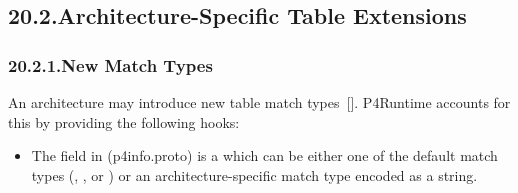\documentclass[11pt]{article}
\begin{document}
{%
\subsection{20.2.\hspace*{0.5em}Architecture-Specific Table Extensions}\label{sec-architecture-specific-table-extensions}%

\subsubsection{20.2.1.\hspace*{0.5em}New Match Types}\label{sec-new-match-types}%

\noindent{}An architecture may introduce new table match types~[]. P4Runtime
accounts for this by providing the following hooks:%

\begin{itemize}%

\item{}
The  field in  (p4info.proto) is a 
which can be either one of the default match types (, , 
or ) or an architecture-specific match type encoded as a string.%


\end{itemize}}
\end{document}
